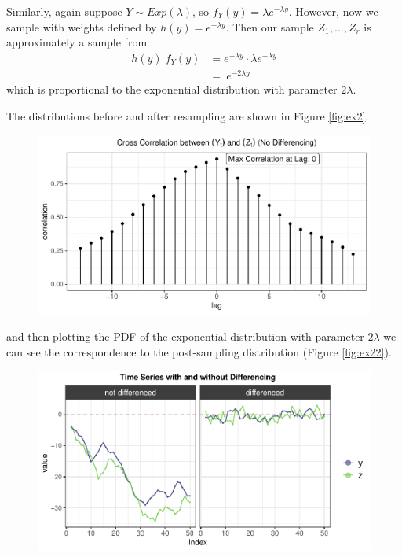 \documentclass[12pt,twoside]{smiththesis}
\begin{document}
Similarly, again suppose \(Y \sim Exp(\lambda)\), so \(f_Y(y) = \lambda e^{-\lambda y}\). However, now we sample with weights defined by \(h(y)= e^{-\lambda y}\).
Then our sample \(Z_1,\dots,Z_r\) is approximately a sample from
\begin{align*} 
h(y) \; f_Y(y) &=   e^{-\lambda y} \cdot \lambda e^{-\lambda y}\\
&= \ e^{-2 \lambda y}  
\end{align*}
which is proportional to the exponential distribution with parameter \(2\lambda\).

The distributions before and after resampling are shown in Figure \ref{fig:ex2}.
\begin{figure}

{\centering \includegraphics[width=1\linewidth]{thesis_files/figure-latex/unnamed-chunk-25-1} 

}

\caption{\label{fig:ex2}}\label{fig:unnamed-chunk-25}
\end{figure}
and then plotting the PDF of the exponential distribution with parameter \(2\lambda\) we can see the correspondence to the post-sampling distribution (Figure \ref{fig:ex22}).
\begin{figure}

{\centering \includegraphics[width=1\linewidth]{thesis_files/figure-latex/unnamed-chunk-26-1} 

}

\caption{\label{fig:ex22}}\label{fig:unnamed-chunk-26}
\end{figure}
\newpage
\end{document}

